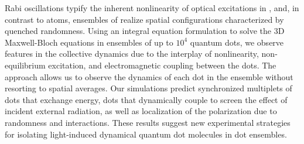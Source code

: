 Rabi oscillations typify the inherent nonlinearity of optical excitations in \qds{}, and, in contrast to atoms, ensembles of \qds{} realize spatial configurations characterized by quenched randomness.
Using an integral equation formulation to solve the 3D Maxwell-Bloch equations in ensembles of up to $10^4$ quantum dots, we observe features in the collective dynamics due to the interplay of nonlinearity, non-equilibrium excitation, and electromagnetic coupling between the dots.
The approach allows us to observe the dynamics of each dot in the ensemble without resorting to spatial averages.
Our simulations predict synchronized multiplets of dots that exchange energy, dots that dynamically couple to screen the effect of incident external radiation, as well as localization of the polarization due to randomness and interactions. These results suggest new experimental strategies for isolating light-induced  dynamical quantum dot molecules in dot ensembles.
